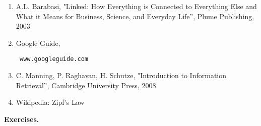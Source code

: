 \documentclass [12pt]{article}
\begin{document}
\begin{enumerate}
\item A.L. Barabasi, "Linked: How Everything is Connected to Everything Else and What it Means for Business,
Science, and Everyday Life'',
Plume Publishing, 2003

\item Google Guide,
\begin{verbatim} www.googleguide.com\end{verbatim}

\item C. Manning, P. Raghavan, H. Schutze, "Introduction to Information Retrieval'',
Cambridge University Press, 2008

\item Wikipedia: Zipf's Law

\end{enumerate}

\vspace{0.5in}
\textbf{Exercises.}
\end{document}
